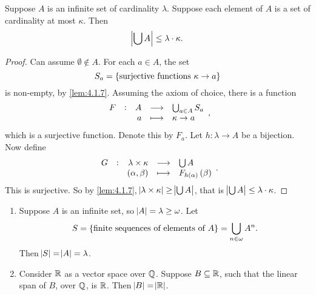 \pagebreak

\begin{theorem}
\label{thm:4.2.6}
Suppose $ A $ is an infinite set of cardinality $ \lambda $. Suppose each element of $ A $ is a set of cardinality at most $ \kappa $. Then
$$ \abs{\bigcup A} \le \lambda \cdot \kappa. $$
\end{theorem}

\begin{proof}
Can assume $ \emptyset \notin A $. For each $ a \in A $, the set
$$ S_a = \cbr{\text{surjective functions} \ \kappa \to a} $$
is non-empty, by \ref{lem:4.1.7}. Assuming the axiom of choice, there is a function
$$ \function[F]{A}{\bigcup_{a \in A} S_a}{a}{\kappa \to a}, $$
which is a surjective function. Denote this by $ F_a $. Let $ h : \lambda \to A $ be a bijection. Now define
$$ \function[G]{\lambda \times \kappa}{\bigcup A}{\br{\alpha, \beta}}{F_{h\br{\alpha}}\br{\beta}}. $$
This is surjective. So by \ref{lem:4.1.7}, $ \abs{\lambda \times \kappa} \ge \abs{\bigcup A} $, that is $ \abs{\bigcup A} \le \lambda \cdot \kappa $.
\end{proof}

\begin{example}
\hfill
\begin{enumerate}
\item Suppose $ A $ is an infinite set, so $ \abs{A} = \lambda \ge \omega $. Let
$$ S = \cbr{\text{finite sequences of elements of} \ A} = \bigcup_{n \in \omega} A^n. $$
Then $ \abs{S} = \abs{A} = \lambda $.
\item Consider $ \mathbb{R} $ as a vector space over $ \mathbb{Q} $. Suppose $ B \subseteq \mathbb{R} $, such that the linear span of $ B $, over $ \mathbb{Q} $, is $ \mathbb{R} $. Then $ \abs{B} = \abs{\mathbb{R}} $.
\end{enumerate}
\end{example}

